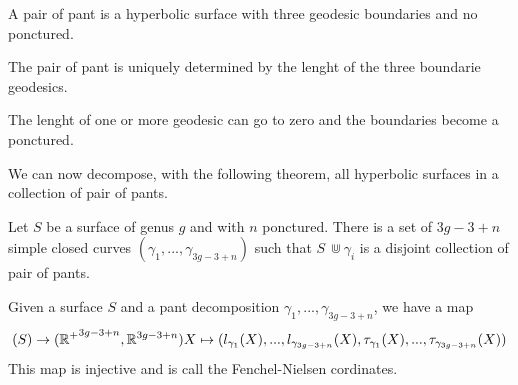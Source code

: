  \begin{dfnt}
 A pair of pant is a hyperbolic surface with three geodesic boundaries and no ponctured.
 \end{dfnt}

\begin{rmq}
The pair of pant is uniquely determined by the lenght of the three boundarie geodesics.
\end{rmq}

\begin{rmq}
The lenght of one or more geodesic can go to zero and the boundaries become a ponctured.
\end{rmq}

We can now decompose, with the following theorem, all hyperbolic surfaces in a collection of pair of pants.

\begin{thm}
Let $S$ be a surface of genus $g$ and with $n$ ponctured. There is a set of $3g-3+n$ simple closed curves $(\gamma_1,...,\gamma_{3g-3+n})$ such that $S\ \Cup \gamma_i$ is a disjoint collection of pair of pants.
\end{thm}

\begin{dfnt}
Given a surface $S$ and a pant decomposition $\gamma_1,...,\gamma_{3g-3+n}$, we have a map \[
\mathcal(S) \rightarrow (\mathbb{R^{+}}^{3g-3+n},\mathbb{R}^{3g-3+n}) \\
X \mapsto (l_{\gamma_1}(X),...,l_{\gamma_{3g-3+n}}(X),\tau_{\gamma_1}(X),...,\tau_{\gamma_{3g-3+n}}(X))
\]
This map is injective and is call the Fenchel-Nielsen cordinates.
\end{dfnt}
